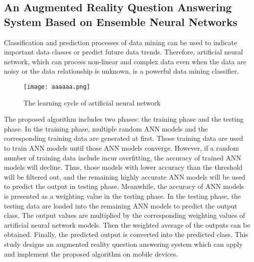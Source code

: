 \documentclass[10pt,a4paper,journal]{IEEEtran}
\begin{document}
\subsection{An Augmented Reality Question Answering System Based on Ensemble Neural Networks\cite{4}}
\hspace{2em} Classification and prediction processes of data mining can
be used to indicate important data classes or predict future
data trends. Therefore, artificial neural network,
which can process non-linear and complex data even when
the data are noisy or the data relationship is unknown, is a
powerful data mining classifier.

\begin{figure}[htbp]
\begin{center}
\hbox{\texttt{[image: aaaaaa.png]}}
\caption{The learning cycle of artificial neural network\cite{4}}
\label{4}
\end{center}
\end{figure} 
\hspace{2em} The proposed algorithm includes two phases: the training
phase and the testing phase. In the training phase, multiple random ANN models and the corresponding training data
are generated at first. Those training data are used to train
ANN models until those ANN models converge. However,
if a random number of training data include incur overfitting,
the accuracy of trained ANN models will decline. Thus, those
models with lower accuracy than the threshold will be filtered
out, and the remaining highly accurate ANN models will
be used to predict the output in testing phase. Meanwhile,
the accuracy of ANN models is presented as a weighting
value in the testing phase. In the testing phase, the testing
data are loaded into the remaining ANN models to predict
the output class. The output values are multiplied by the
corresponding weighting values of artificial neural network
models. Then the weighted average of the outputs can be
obtained. Finally, the predicted output is converted into the
predicted class. This study designs an augmented reality
question answering system which can apply and
implement the proposed algorithm on mobile devices.\\
\end{document}
